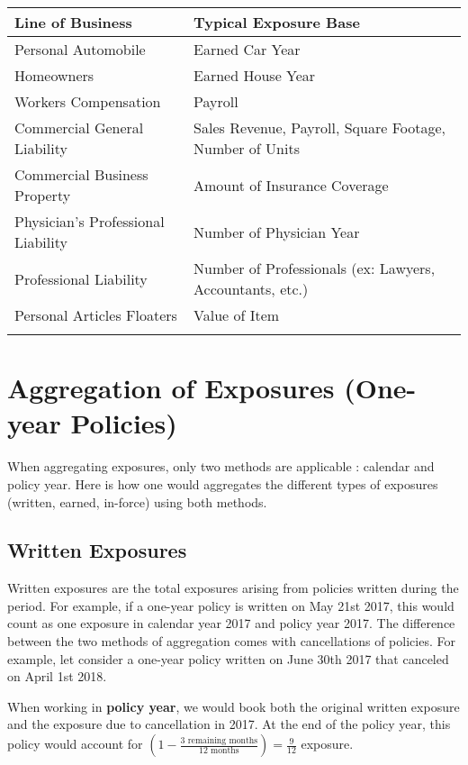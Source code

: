 \documentclass[11pt, english]{memoir}
\numberwithin{definition}{section}
\begin{document}
		\begin{tabular}{ll}
		\toprule[1pt]
		\textbf{Line of Business} & \textbf{Typical Exposure Base}\\
		\midrule[1pt]
		Personal Automobile & Earned Car Year\\
		Homeowners & Earned House Year \\
		Workers Compensation & Payroll \\
		Commercial General Liability & Sales Revenue, Payroll, Square Footage, Number of Units\\
		Commercial Business Property & Amount of Insurance Coverage \\
		Physician's Professional Liability & Number of Physician Year \\
		Professional Liability & Number of Professionals (ex: Lawyers, Accountants, etc.)\\
		Personal Articles Floaters & Value of Item\\
		\bottomrule[1pt]\\
		\end{tabular}



\section{Aggregation of Exposures (One-year Policies)}
	When aggregating exposures, only two methods are applicable : calendar and policy year. Here is how one would aggregates the different types of exposures (written, earned, in-force) using both methods. 

	\subsection{Written Exposures}
	
		Written exposures are the total exposures arising from policies written during the period. For example, if a one-year policy is written on May 21st 2017, this would count as one exposure in calendar year 2017 and policy year 2017. The difference between the two methods of aggregation comes with cancellations of policies. For example, let consider a one-year policy written on June 30th 2017 that canceled on April 1st 2018. 
	
		When working in \textbf{policy year}, we would book both the original written exposure and the exposure due to cancellation in 2017. At the end of the policy year, this policy would account for $(1-\frac{\text{3 remaining months}}{\text{12 months}}) = \frac{9}{12}$ exposure.
	
\end{document}
